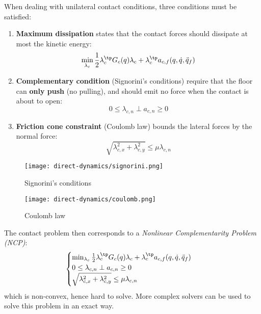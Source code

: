 When dealing with unilateral contact conditions, three conditions must be satisfied:
\begin{enumerate}
    \item \textbf{Maximum dissipation} states that the contact forces should dissipate at most the kinetic energy:
    \begin{equation*}
        \min_{\lambda_c} \frac{1}{2}\lambda_c^\tp G_c(q)\lambda_c + \lambda_c^\tp a_{c, f}(q, \dot{q}, \ddot{q}_f)
    \end{equation*}
    \item \textbf{Complementary condition} (Signorini's conditions) require that the floor can \textbf{only push} (no pulling), and should emit no force when the contact is about to open:
    \begin{equation*}
        0\leq\lambda_{c,n} \perp a_{c,n}\geq 0
    \end{equation*}
    \item \textbf{Friction cone constraint} (Coulomb law) bounds the lateral forces by the normal force:
    \begin{equation*}
        \sqrt{\lambda_{c,x}^2 + \lambda_{c,y}^2} \leq \mu\lambda_{c,n}
    \end{equation*}
\end{enumerate}

\begin{figure}[H]
    \centering
    \begin{minipage}{0.4\textwidth}
        \centering
        \texttt{[image: direct-dynamics/signorini.png]}
        \caption*{Signorini's conditions}
    \end{minipage}
    \begin{minipage}{0.4\textwidth}
        \centering
        \texttt{[image: direct-dynamics/coulomb.png]}
        \caption*{Coulomb law}
    \end{minipage}
\end{figure}

The contact problem then corresponds to a \emph{Nonlinear Complementarity Problem (NCP)}:
\begin{equation*}
    \begin{cases}
        \min_{\lambda_c} \frac{1}{2}\lambda_c^\tp G_c(q)\lambda_c + \lambda_c^\tp a_{c, f}(q, \dot{q}, \ddot{q}_f) \\
        0\leq\lambda_{c,n} \perp a_{c,n}\geq 0 \\
        \sqrt{\lambda_{c,x}^2 + \lambda_{c,y}^2} \leq \mu\lambda_{c,n}
    \end{cases}
\end{equation*}
which is non-convex, hence hard to solve. More complex solvers can be used to solve this problem in an exact way.

